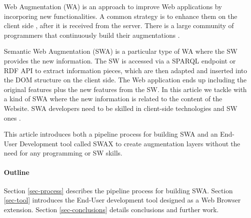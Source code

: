 \documentclass[runningheads]{llncs}
\begin{document}
Web Augmentation (WA) is an approach to improve Web applications by incorporing new functionalities.  A common strategy is to enhance them on the client side \cite{Bouvin1999UnifyingAugmentation}, after it is received from the server. There is a large community of programmers that continuously build their augmentations \cite{Firmenich2014}.

Semantic Web Augmentation (SWA) is a particular type of WA where the SW provides the new information. The SW is accessed via a SPARQL endpoint or RDF API to extract information pieces, which are then adapted and inserted into the DOM structure on the client side. The Web application ends up including the original features plus the new features from the SW. In this article we tackle with a kind of SWA where the new information is related to the content of the Website. SWA developers need to be skilled in client-side technologies and SW ones \cite{Rico2012AData}.

This article introduces both a pipeline process for building SWA and an End-User Development tool called SWAX to create augmentation layers without the need for any programming or SW skills.

\paragraph{Outline} Section \ref{sec-process} describes the pipeline process for building SWA. Section \ref{sec-tool} introduces the End-User development tool designed as a Web Browser extension. Section \ref{sec-conclusions} details conclusions and further work. 




\end{document}
